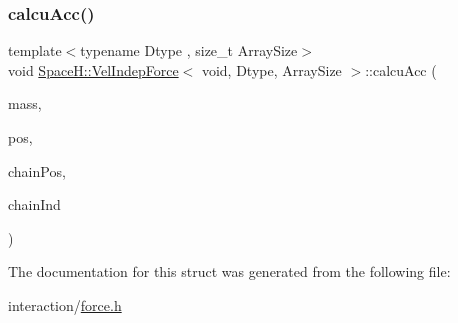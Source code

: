 \mbox{\label{struct_space_h_1_1_vel_indep_force_3_01void_00_01_dtype_00_01_array_size_01_4_a9aefde5ef77e7fa4ecb8ab141136e45e}} 
\subsubsection{\texorpdfstring{calcu\+Acc()}{calcuAcc()}\hspace{0.1cm}{\footnotesize\ttfamily [2/2]}}
{\footnotesize\ttfamily template$<$typename Dtype , size\+\_\+t Array\+Size$>$ \\
void \mbox{\hyperlink{struct_space_h_1_1_vel_indep_force}{Space\+H\+::\+Vel\+Indep\+Force}}$<$ void, Dtype, Array\+Size $>$\+::calcu\+Acc (\begin{DoxyParamCaption}\item[{const \mbox{\hyperlink{struct_space_h_1_1_vel_indep_force_3_01void_00_01_dtype_00_01_array_size_01_4_abac00e98d91b617794c41acf2a4ee4d5}{Scalar\+Array}} \&}]{mass,  }\item[{const \mbox{\hyperlink{struct_space_h_1_1_vel_indep_force_3_01void_00_01_dtype_00_01_array_size_01_4_ab547eb9c08979f28c5afafae93480702}{Vector\+Array}} \&}]{pos,  }\item[{const \mbox{\hyperlink{struct_space_h_1_1_vel_indep_force_3_01void_00_01_dtype_00_01_array_size_01_4_ab547eb9c08979f28c5afafae93480702}{Vector\+Array}} \&}]{chain\+Pos,  }\item[{const \mbox{\hyperlink{struct_space_h_1_1_vel_indep_force_3_01void_00_01_dtype_00_01_array_size_01_4_ac09f6af9183141c8f56422420ce85302}{Index\+Array}} \&}]{chain\+Ind }\end{DoxyParamCaption})\hspace{0.3cm}{\ttfamily [inline]}}



The documentation for this struct was generated from the following file\+:\begin{DoxyCompactItemize}
\item 
interaction/\mbox{\hyperlink{force_8h}{force.\+h}}\end{DoxyCompactItemize}
